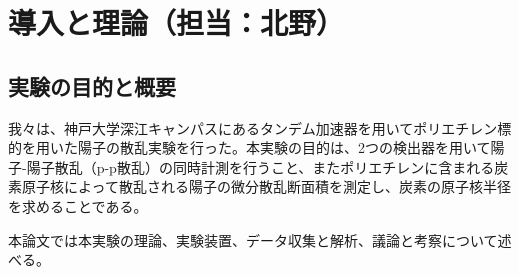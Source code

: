 \documentclass[a4paper,11pt,dvipdfmx]{jsarticle}
\begin{document}
\newpage
\section{\LARGE{導入と理論（担当：北野）}}

\subsection{実験の目的と概要}
我々は、神戸大学深江キャンパスにあるタンデム加速器を用いてポリエチレン標的を用いた陽子の散乱実験を行った。本実験の目的は、2つの検出器を用いて陽子-陽子散乱（p-p散乱）の同時計測を行うこと、またポリエチレンに含まれる炭素原子核によって散乱される陽子の微分散乱断面積を測定し、炭素の原子核半径を求めることである。

本論文では本実験の理論、実験装置、データ収集と解析、議論と考察について述べる。
\end{document}
